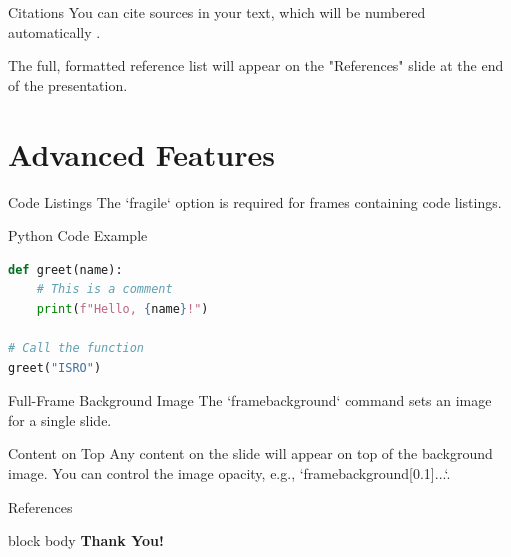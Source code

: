 \documentclass[serif]{NRSCISRO}
\begin{document}
\begin{frame}{Citations}
    You can cite sources in your text, which will be numbered automatically \cite{Einstein1926}.
    
    \bigskip %

    The full, formatted reference list will appear on the "References" slide at the end of the presentation.
\end{frame}

\section{Advanced Features}

\begin{frame}[fragile]{Code Listings}
    The `fragile` option is required for frames containing code listings.
    \begin{exampleblock}{Python Code Example}
\begin{lstlisting}[language=Python]
def greet(name):
    # This is a comment
    print(f"Hello, {name}!")

# Call the function
greet("ISRO")
\end{lstlisting}
    \end{exampleblock}
\end{frame}

\begin{frame}{Full-Frame Background Image}
    The `framebackground{}` command sets an image for a single slide.
    \begin{alertblock}{Content on Top}
        Any content on the slide will appear on top of the background image. You can control the image opacity, e.g., `framebackground[0.1]{...}`.
    \end{alertblock}
\end{frame}


\begin{frame}[allowframebreaks]{References}
    \printbibliography
\end{frame}

\begin{frame}[plain] 
    \vfill
    \centering
    \begin{beamercolorbox}[center, rounded=true, shadow=false]{block body}
        \Huge{\textbf{\textcolor{ISROBlue}{Thank You!}}}
    \end{beamercolorbox}
    \vfill
\end{frame}
\end{document}
